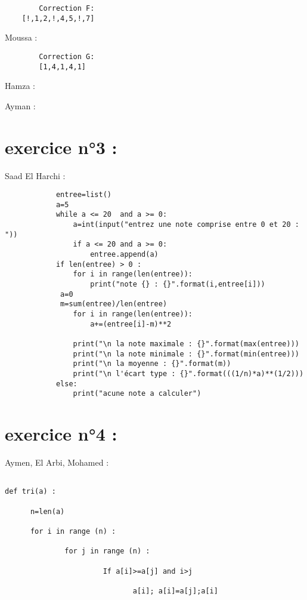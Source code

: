 \documentclass{article}
\begin{document}
	\begin{verbatim}
		Correction F:
	[!,1,2,!,4,5,!,7]

	\end{verbatim}
	
    	\begin{center}
    		Moussa :
	\end{center} 
	
	\begin{verbatim}
		Correction G:
		[1,4,1,4,1]
	\end{verbatim}

    	\begin{center}
    		Hamza :
	\end{center} 


	\begin{center}
    		Ayman :
	\end{center} 
	
\section{exercice n°3 :}
        \begin{center}
    		Saad El Harchi :
	\end{center}    	  
        	
    	\begin{verbatim}
			entree=list()
			a=5
			while a <= 20  and a >= 0:
    			a=int(input("entrez une note comprise entre 0 et 20 : "))
    			if a <= 20 and a >= 0:
        			entree.append(a) 
			if len(entree) > 0 :
    			for i in range(len(entree)):
        			print("note {} : {}".format(i,entree[i]))
   			 a=0
   			 m=sum(entree)/len(entree)
    			for i in range(len(entree)):
        			a+=(entree[i]-m)**2
    
    			print("\n la note maximale : {}".format(max(entree)))
    			print("\n la note minimale : {}".format(min(entree)))
    			print("\n la moyenne : {}".format(m))
    			print("\n l'écart type : {}".format(((1/n)*a)**(1/2)))
			else:
    			print("acune note a calculer")
		\end{verbatim}

\section{exercice n°4 :}
	\begin{center}
    		Aymen, El Arbi, Mohamed :
	\end{center}
	\begin{verbatim}
	
def tri(a) :

      n=len(a)

      for i in range (n) :

              for j in range (n) :

                       If a[i]>=a[j] and i>j

                              a[i]; a[i]=a[j];a[i]
	\end{verbatim}
\end{document}
